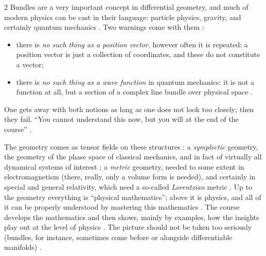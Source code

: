 \begin{paracol}{2}
Bundles are a very important concept in differential geometry, and much of modern physics can be cast in
their language: particle physics, gravity, and certainly quantum mechanics . Two warnings come
with them :
\begin{itemize}
  \item there is \emph{no such thing as a position vector}, however often it is repeated: a position vector
        is just a collection of coordinates, and these do not constitute a vector;
  \item there is \emph{no such thing as a wave function} in quantum mechanics: it is not a function at all,
        but a section of a complex line bundle over physical space .
\end{itemize}
One gets away with both notions as long as one does not look too closely; then they fail. ``You cannot
understand this now, but you will at the end of the course'' .

The geometry comes as tensor fields on these structures : a \emph{symplectic} geometry, the
geometry of the phase space of classical mechanics, and in fact of virtually all dynamical systems of interest
; a \emph{metric} geometry, needed to some extent in electromagnetism (there, really, only a
volume form is needed), and certainly in special and general relativity, which need a so-called
\emph{Lorentzian} metric . Up to the geometry everything is ``physical mathematics''; above it
is physics, and all of it can be properly understood by mastering this mathematics . The
course develops the mathematics and then shows, mainly by examples, how the insights play out at the level of
physics . The picture should not be taken too seriously (bundles, for instance, sometimes come
before or alongside differentiable manifolds) .

\begin{nfigure}
\caption{The building of the course, from the bottom up . Up to geometry it is mathematics;
the top floor is physics.}\label{fig:lo-building}
\end{nfigure}


\end{paracol}
